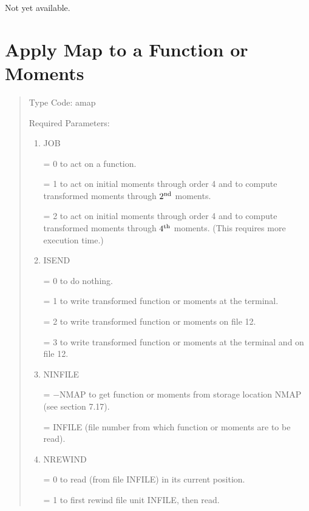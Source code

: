 Not yet available.

\newpage
\section{Apply Map to a Function or Moments}  
\begin{quotation}
\noindent     Type Code:  amap
\vspace{5mm}

\noindent Required Parameters:
\begin{enumerate}
      \item  JOB

             = 0 to act on a function.

             = 1 to act on initial moments through order 4 and to compute
               transformed \hspace*{1em}moments through $2^{\mbox{\scriptsize nd}}$ moments.

             = 2 to act on initial moments through order 4 and to compute
               transformed \hspace*{1em}moments through $4^{\mbox{\scriptsize th}}$ moments.  (This requires more execution time.)

      \item  ISEND

             = 0 to do nothing.

             = 1 to write transformed function or moments at the terminal.

             = 2 to write transformed function or moments on file 12.

             = 3 to write transformed function or moments at the terminal
			 and on file \hspace*{1em}12.

      \item  NINFILE

             = $-$NMAP to get function or moments from storage location NMAP
			   (see \hspace*{1em}section 7.17).

             = INFILE (file number from which function or moments are to be
               read).

      \item  NREWIND

             = 0 to read (from file INFILE) in its current position.

             = 1 to first rewind file unit INFILE, then read.


\end{enumerate}
\end{quotation}
